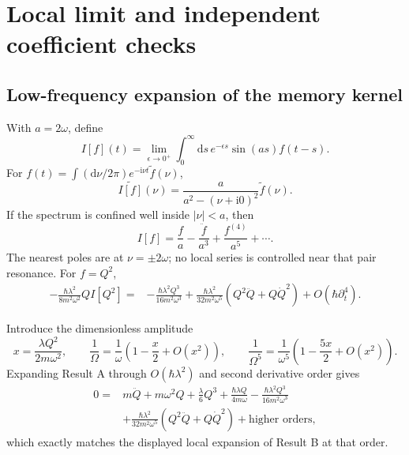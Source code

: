 \documentclass[9pt]{extarticle}
\newcommand{\dd}{\mathrm d}
\newcommand{\ii}{\mathrm i}
\newcommand{\Om}{\Omega}
\begin{document}
\section{Local limit and independent coefficient checks}

\subsection{Low-frequency expansion of the memory kernel}

With $a=2\omega$, define
\begin{equation}
I[f](t)=\lim_{\epsilon\to0^+}\int_0^\infty\dd s\,e^{-\epsilon s}\sin(as)f(t-s).
\label{eq:I}
\end{equation}
For $f(t)=\int(\dd\nu/2\pi)e^{-\ii\nu t}\tilde f(\nu)$,
\begin{equation}
\widetilde{I[f]}(\nu)=\frac{a}{a^2-(\nu+\ii0)^2}\tilde f(\nu).
\label{eq:transfer}
\end{equation}
If the spectrum is confined well inside $|\nu|<a$, then
\begin{equation}
I[f]=\frac f a-\frac{\ddot f}{a^3}+\frac{f^{(4)}}{a^5}+\cdots.
\label{eq:Iexp}
\end{equation}
The nearest poles are at $\nu=\pm2\omega$; no local series is controlled near that pair resonance.  For $f=Q^2$,
\begin{align}
-\frac{\hbar\lambda^2}{8m^2\omega^2}QI[Q^2]
={}&-\frac{\hbar\lambda^2Q^3}{16m^2\omega^3}
+\frac{\hbar\lambda^2}{32m^2\omega^5}
\left(Q^2\ddot Q+Q\dot Q^2\right)
+O(\hbar\partial_t^4).
\label{eq:memorylocal}
\end{align}

Introduce the dimensionless amplitude
\begin{equation}
x=\frac{\lambda Q^2}{2m\omega^2},
\qquad
\frac1\Om=\frac1\omega\left(1-\frac x2+O(x^2)\right),
\qquad
\frac1{\Om^5}=\frac1{\omega^5}\left(1-\frac{5x}{2}+O(x^2)\right).
\label{eq:x}
\end{equation}
Expanding Result A through $O(\hbar\lambda^2)$ and second derivative order gives
\begin{equation}
\begin{aligned}
0={}&m\ddot Q+m\omega^2Q+\frac\lambda6Q^3+\frac{\hbar\lambda Q}{4m\omega}
-\frac{\hbar\lambda^2Q^3}{16m^2\omega^3}\\
&+\frac{\hbar\lambda^2}{32m^2\omega^5}
\left(Q^2\ddot Q+Q\dot Q^2\right)+\text{higher orders},
\end{aligned}
\label{eq:match}
\end{equation}
which exactly matches the displayed local expansion of Result B at that order.
\end{document}
